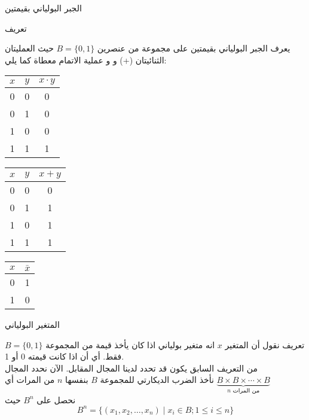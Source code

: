 \begin{frame}{الجبر البولياني بقيمتين}
	\begin{exampleblock}{تعريف}
		
		يعرف الجبر البولياني بقيمتين على مجموعة من عنصرين $B = \{0, 1\}$ حيث العمليتان الثنائيتان (+) و 
		\en{($\cdot$)} و عملية الاتمام معطاة كما يلي:
		
		\pause
		\begin{english}
			\begin{table}[H]
				\centering
				\begin{minipage}{0.3\textwidth}
					\centering
					\begin{tabular}{|c|c|c|}
						\hline
						$x$ & $y$ & $x\cdot y$ \\
						\hline
						0 & 0 & 0 \\
						0 & 1 & 0 \\
						1 & 0 & 0 \\
						1 & 1 & 1 \\
						\hline
					\end{tabular}
				\end{minipage}
				\begin{minipage}{0.3\textwidth}
					\centering
					\begin{tabular}{|c|c|c|}
						\hline
						$x$ & $y$ & $x + y$ \\
						\hline
						0 & 0 & 0 \\
						0 & 1 & 1 \\
						1 & 0 & 1 \\
						1 & 1 & 1 \\
						\hline
					\end{tabular}
				\end{minipage}
				\begin{minipage}{0.3\textwidth}
					\centering
					\begin{tabular}{|c|c|}
						\hline
						$x$ & $\bar{x}$\\
						\hline
						0 & 1\\
						1 & 0\\
						\hline
					\end{tabular}
				\end{minipage}
			\end{table}
		\end{english}
	\end{exampleblock}
\end{frame}

\begin{frame}{المتغير البولياني}
	\begin{exampleblock}{تعريف}
		نقول أن المتغير $x$ انه متغير بولياني اذا كان يأخذ قيمة من المجموعة $B=\{0,1\}$ فقط. أي أن اذا كانت قيمته 0 أو 1.\\
		من  التعريف السابق يكون قد تحدد لدينا المجال المقابل. الآن نحدد المجال\\
		نأخذ الضرب الديكارتي للمجموعة $B$ بنفسها $n$ من المرات أي 
		$\underbrace{B\times B \times \cdots \times B}_{\text{$n$ من المرات}}$\\
		نحصل على $B^n$ حيث 
		\[
		B^n = \{(x_1, x_2, \dots, x_n) \mid x_i \in B ; 1 \leq i\leq n\}
		\]
	\end{exampleblock}
\end{frame}

